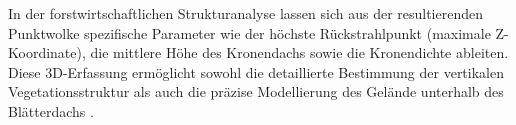 In der forstwirtschaftlichen Strukturanalyse lassen sich aus der resultierenden Punktwolke spezifische Parameter wie der höchste Rückstrahlpunkt (maximale Z-Koordinate), die mittlere Höhe des Kronendachs sowie die Kronendichte ableiten. Diese 3D-Erfassung ermöglicht sowohl die detaillierte Bestimmung der vertikalen Vegetationsstruktur als auch die präzise Modellierung des Gelände unterhalb des Blätterdachs \cite{thapaForestAbovegroundBiomass2025}.

  